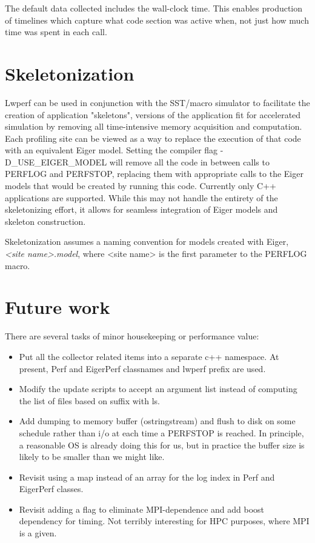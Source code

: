 \documentclass{article}
\begin{document}
The default data collected includes the wall-clock time. This enables production of timelines which capture what code section was active when, not just how much time was spent in each call.

\section{Skeletonization}
Lwperf can be used in conjunction with the SST/macro simulator to facilitate the creation of application "skeletons", versions of the application fit for accelerated simulation by removing all time-intensive memory acquisition and computation. Each profiling site can be viewed as a way to replace the execution of that code with an equivalent Eiger model. Setting the compiler flag -D\_USE\_EIGER\_MODEL will remove all the code in between calls to PERFLOG and PERFSTOP, replacing them with appropriate calls to the Eiger models that would be created by running this code. Currently only C++ applications are supported. While this may not handle the entirety of the skeletonizing effort, it allows for seamless integration of Eiger models and skeleton construction. 

Skeletonization assumes a naming convention for models created with Eiger, \textit{<site name>.model}, where <site name> is the first parameter to the PERFLOG macro.


\section{Future work}

There are several tasks of minor housekeeping or performance value:
\begin{itemize}

\item Put all the collector related items into a separate c++ namespace. At present, Perf and EigerPerf classnames and lwperf prefix are used.

\item Modify the update scripts to accept an argument list instead of computing
the list of files based on suffix with ls.

\item Add dumping to memory buffer (ostringstream) and flush to disk on some schedule rather than i/o at each time a PERFSTOP is reached. In principle, a reasonable OS is already doing this for us, but in practice the buffer size is likely to be smaller than we might like.

\item Revisit using a map instead of an array for the log index in Perf and EigerPerf classes.

\item Revisit adding a flag to eliminate MPI-dependence and add boost dependency for timing. Not terribly interesting for HPC purposes, where MPI is a given.
\end{itemize}
\end{document}
